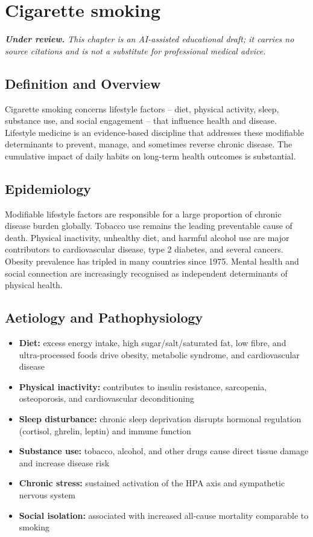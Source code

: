 \chapter{Cigarette smoking}

\medskip
\noindent\textit{\textbf{Under review.} This chapter is an AI-assisted educational draft; it carries no source citations and is not a substitute for professional medical advice.}

\section*{Definition and Overview}
Cigarette smoking concerns lifestyle factors -- diet, physical activity, sleep, substance use, and social engagement -- that influence health and disease. Lifestyle medicine is an evidence-based discipline that addresses these modifiable determinants to prevent, manage, and sometimes reverse chronic disease. The cumulative impact of daily habits on long-term health outcomes is substantial.

\section*{Epidemiology}
Modifiable lifestyle factors are responsible for a large proportion of chronic disease burden globally. Tobacco use remains the leading preventable cause of death. Physical inactivity, unhealthy diet, and harmful alcohol use are major contributors to cardiovascular disease, type 2 diabetes, and several cancers. Obesity prevalence has tripled in many countries since 1975. Mental health and social connection are increasingly recognised as independent determinants of physical health.

\section*{Aetiology and Pathophysiology}
\begin{itemize}
    \item \textbf{Diet:} excess energy intake, high sugar/salt/saturated fat, low fibre, and ultra-processed foods drive obesity, metabolic syndrome, and cardiovascular disease
    \item \textbf{Physical inactivity:} contributes to insulin resistance, sarcopenia, osteoporosis, and cardiovascular deconditioning
    \item \textbf{Sleep disturbance:} chronic sleep deprivation disrupts hormonal regulation (cortisol, ghrelin, leptin) and immune function
    \item \textbf{Substance use:} tobacco, alcohol, and other drugs cause direct tissue damage and increase disease risk
    \item \textbf{Chronic stress:} sustained activation of the HPA axis and sympathetic nervous system
    \item \textbf{Social isolation:} associated with increased all-cause mortality comparable to smoking
\end{itemize}

